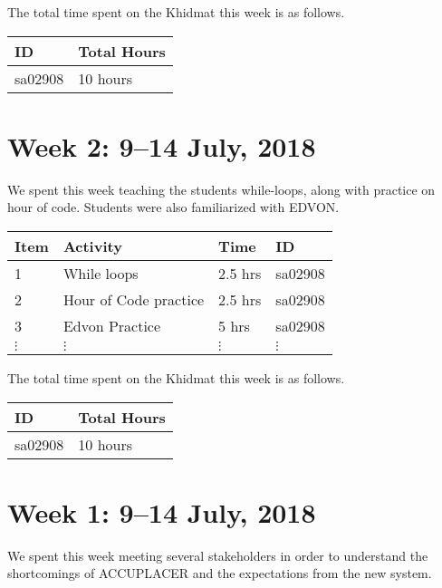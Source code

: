 \documentclass{article}
\begin{document}
The total time spent on the Khidmat this week is as follows.

\begin{tabular}{|l|l|}
  \hline
  ID & Total Hours\\\hline\hline
  sa02908 & 10 hours\\\hline
\end{tabular}


\newpage %
\section*{Week 2: 9--14 July, 2018}

We spent this week teaching the students while-loops, along with practice on hour of code. Students were also familiarized with EDVON.

\begin{tabular}{|l|l|l|l|}
  \hline
  Item  & Activity & Time & ID \\\hline\hline
  1 & While loops & 2.5 hrs & sa02908 \\\hline
  2 & Hour of Code practice & 2.5 hrs & sa02908 \\\hline
  3 & Edvon Practice & 5 hrs & sa02908 \\\hline
  $\vdots$ & $\vdots$ & $\vdots$ & $\vdots$ \\\hline
\end{tabular}

The total time spent on the Khidmat this week is as follows.

\begin{tabular}{|l|l|}
  \hline
  ID & Total Hours\\\hline\hline
  sa02908 & 10 hours\\\hline
\end{tabular}


\newpage %
\section*{Week 1: 9--14 July, 2018}

We spent this week meeting several stakeholders in order to understand the shortcomings of ACCUPLACER and the expectations from the new system.
\end{document}

